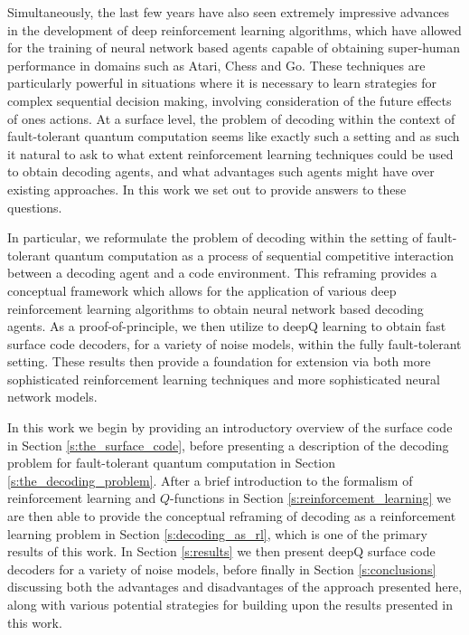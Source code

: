 \documentclass[onecolumn,preprintnumbers,amsmath,amssymb,notitlepage,nofootinbib,longbibliography,superscriptaddress]{revtex4-1}
\begin{document}
    Simultaneously, the last few years have also seen extremely impressive advances in the development of deep reinforcement learning algorithms, which have allowed for the training of neural network based agents capable of obtaining super-human performance in domains such as Atari, Chess and Go. These techniques are particularly powerful in situations where it is necessary to learn strategies for complex sequential decision making, involving consideration of the future effects of ones actions. At a surface level, the problem of decoding within the context of fault-tolerant quantum computation seems like exactly such a setting and as such it natural to ask to what extent reinforcement learning techniques could be used to obtain decoding agents, and what advantages such agents might have over existing approaches. In this work we set out to provide answers to these questions.

    In particular, we reformulate the problem of decoding within the setting of fault-tolerant quantum computation as a process of sequential competitive interaction between a decoding agent and a code environment. This reframing provides a conceptual framework which allows for the application of various deep reinforcement learning algorithms to obtain neural network based decoding agents. As a proof-of-principle, we then utilize to deepQ learning to obtain fast surface code decoders, for a variety of noise models, within the fully fault-tolerant setting. These results then provide a foundation for extension via both more sophisticated reinforcement learning techniques and more sophisticated neural network models.

    In this work we begin by providing an introductory overview of the surface code in Section \ref{s:the_surface_code}, before presenting a description of the decoding problem for fault-tolerant quantum computation in Section \ref{s:the_decoding_problem}. After a brief introduction to the formalism of reinforcement learning and $Q$-functions in Section \ref{s:reinforcement_learning} we are then able to provide the conceptual reframing of decoding as a reinforcement learning problem in Section \ref{s:decoding_as_rl}, which is one of the primary results of this work. In Section \ref{s:results} we then present deepQ surface code decoders for a variety of noise models, before finally in Section \ref{s:conclusions} discussing both the advantages and disadvantages of the approach presented here, along with various potential strategies for building upon the results presented in this work.
\end{document}
